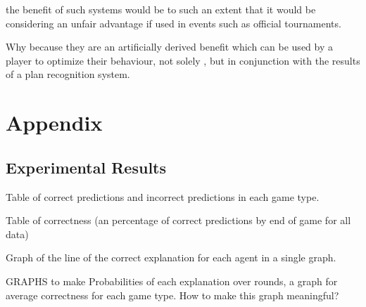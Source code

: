 \documentclass[parskip]{cs4rep}
\begin{document}
the benefit of such systems would be to such an extent that it would be considering an unfair advantage if used in events such as official tournaments.

Why because they are an artificially derived benefit which can be used by a player to optimize their behaviour, not solely , but in conjunction with the results of a plan recognition system.

\chapter{Appendix}

\section{Experimental Results}

Table of correct predictions and incorrect predictions in each game type.

Table of correctness (an percentage of correct predictions by end of game for all data)

Graph of the line of the correct explanation for each agent in a single graph.

GRAPHS to make
Probabilities of each explanation over rounds, a graph for average correctness for each game type.
How to make this graph meaningful?



\end{document}
